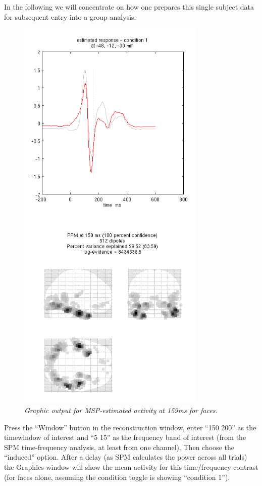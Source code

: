 In the following we will concentrate on how one prepares this single subject data for subsequent entry into a group analysis.

\begin{figure}
\begin{center}
\includegraphics[width=90mm]{multimodal/figures/meg_msp.png}
\caption{\em  Graphic output for MSP-estimated activity at 159ms for faces.\label{multimodal:fig:18}}
\end{center}
\end{figure}

Press the ``Window'' button in the reconstruction window, enter ``150 200'' as the timewindow of interest and ``5 15'' as the frequency band of interest (from the SPM time-frequency analysis, at least from one channel). Then choose the ``induced'' option. After a delay (as SPM calculates the power across all trials) the Graphics window will show the mean activity for this time/frequency contrast (for faces alone, assuming the condition toggle is showing ``condition 1'').

